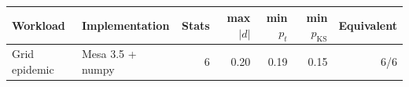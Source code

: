 \begin{tabular}{llrrrrr}
\toprule
Workload & Implementation & Stats & max $|d|$ & min $p_{t}$ & min $p_{\mathrm{KS}}$ & Equivalent \\
\midrule
Grid epidemic & Mesa 3.5 + numpy & 6 & 0.20 & 0.19 & 0.15 & 6/6 \\
\bottomrule
\end{tabular}
